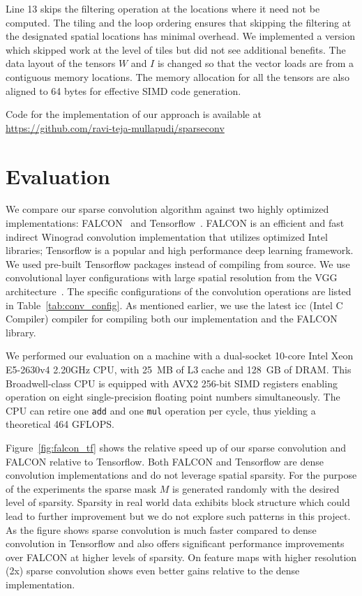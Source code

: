 \documentclass{article}
\begin{document}
Line 13 skips the filtering operation at the locations where it need not be
computed. The tiling and the loop ordering ensures that skipping the filtering
at the designated spatial locations has minimal overhead. We implemented a
version which skipped work at the level of tiles but did not see additional
benefits. The data layout of the tensors $W$ and $I$ is changed so that the
vector loads are from a contiguous memory locations. The memory allocation for
all the tensors are also aligned to 64 bytes for effective SIMD code generation.

Code for the implementation of our approach is available at
\href{https://github.com/ravi-teja-mullapudi/sparseconv}{https://github.com/ravi-teja-mullapudi/sparseconv}

\section{Evaluation}
\label{sec:eval}
We compare our sparse convolution algorithm against two highly optimized
implementations: FALCON~\cite{falcon} and Tensorflow~\cite{tensorflow}.  FALCON
is an efficient and fast indirect Winograd convolution implementation that
utilizes optimized Intel libraries; Tensorflow is a popular and high performance
deep learning framework. We used pre-built Tensorflow packages instead of
compiling from source. We use convolutional layer configurations with large
spatial resolution from the VGG architecture~\cite{simonyan2014very}.  The
specific configurations of the convolution operations are listed in
Table~\ref{tab:conv_config}. As mentioned earlier, we use the latest icc (Intel
C Compiler) compiler for compiling both our implementation and the FALCON
library. 

We performed our evaluation on a machine with a dual-socket 10-core Intel 
Xeon E5-2630v4 2.20GHz CPU, with 25~MB of L3 cache and 128~GB of DRAM. This 
Broadwell-class CPU is equipped with AVX2 256-bit SIMD registers enabling
operation on eight single-precision floating point numbers simultaneously. 
The CPU can retire one \texttt{add} and one \texttt{mul} operation per cycle,
thus yielding a theoretical 464 GFLOPS.

Figure~\ref{fig:falcon_tf} shows the relative speed up of our sparse convolution
and FALCON relative to Tensorflow. Both FALCON and Tensorflow are dense
convolution implementations and do not leverage spatial sparsity. For the
purpose of the experiments the sparse mask $M$ is generated randomly with the
desired level of sparsity. Sparsity in real world data exhibits block structure
which could lead to further improvement but we do not explore such patterns in
this project. As the figure shows sparse convolution is much faster compared to
dense convolution in Tensorflow and also offers significant performance
improvements over FALCON at higher levels of sparsity. On feature maps with
higher resolution (2x) sparse convolution shows even better gains relative to
the dense implementation.
\end{document}
